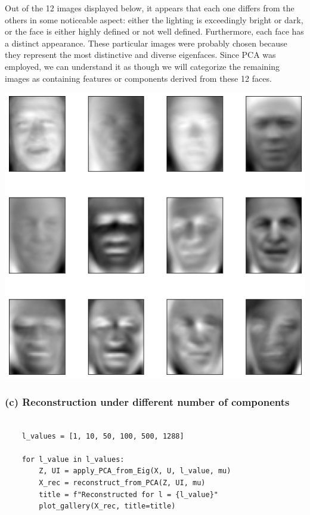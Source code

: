 \documentclass[11pt]{article}
\newcommand{\sol}[1]{{\bf{\color{magenta}{{Solution:}}}}}
\begin{document}
Out of the 12 images displayed below, it appears that each one differs from the others in some noticeable aspect: either the lighting is exceedingly bright or dark, or the face is either highly defined or not well defined. Furthermore, each face has a distinct appearance. These particular images were probably chosen because they represent the most distinctive and diverse eigenfaces. Since PCA was employed, we can understand it as though we will categorize the remaining images as containing features or components derived from these 12 faces.

\begin{center}
    \includegraphics[scale=0.6]{1b.png}
\end{center}

\subsubsection{(c) Reconstruction under different number of components}
\sol x
\begin{verbatim}

    l_values = [1, 10, 50, 100, 500, 1288]

    for l_value in l_values:
        Z, UI = apply_PCA_from_Eig(X, U, l_value, mu)
        X_rec = reconstruct_from_PCA(Z, UI, mu)
        title = f"Reconstructed for l = {l_value}"
        plot_gallery(X_rec, title=title)
        
\end{verbatim}
\end{document}
